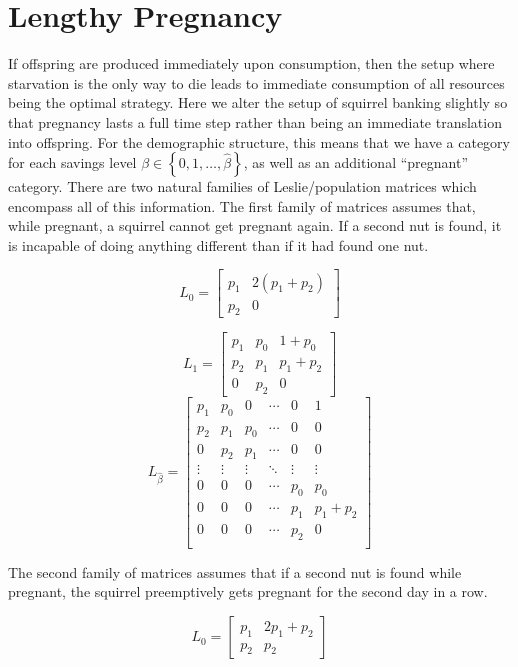 \section{Lengthy Pregnancy}
If offspring are produced immediately upon consumption, then the setup where starvation is the only way to die
leads to immediate consumption of all resources being the optimal strategy. Here we alter the setup of squirrel
banking slightly so that pregnancy lasts a full time step rather than being an immediate translation into offspring.
For the demographic structure, this means that we have a category for each savings level $\beta\in\left\{ 0
, 1, \ldots, \hat \beta\right\}$, as well as an additional ``pregnant'' category. There are two natural families
of Leslie/population matrices which encompass all of this information. The first family of matrices assumes that,
while pregnant, a squirrel cannot get pregnant again. If a second nut is found, it is incapable of doing anything
different than if it had found one nut.

$$L_0 = 
\begin{bmatrix}
    p_1 & 2(p_1 + p_2) \\
    p_2 & 0
\end{bmatrix}
$$

$$ L_1 =
\begin{bmatrix}
    p_1 & p_0 & 1 + p_0 \\
    p_2 & p_1 & p_1 + p_2 \\
    0 & p_2 & 0
\end{bmatrix}
$$
$$L_{\hat \beta} = 
\begin{bmatrix}
    p_1 & p_0 & 0 & \cdots & 0 & 1 \\
    p_2 & p_1 & p_0 & \cdots & 0 & 0 \\
    0 & p_2 & p_1 & \cdots & 0 & 0 \\
    \vdots & \vdots & \vdots & \ddots & \vdots & \vdots \\
    0 & 0 & 0 & \cdots & p_0 & p_0 \\
    0 & 0 & 0 & \cdots & p_1 & p_1 + p_2 \\
    0 & 0 & 0 & \cdots & p_2 & 0 \\
\end{bmatrix}
$$

The second family of matrices assumes that if a second nut is found while pregnant, the squirrel preemptively gets pregnant
for the second day in a row. 

$$L_0 = 
\begin{bmatrix}
    p_1 & 2p_1 + p_2 \\
    p_2 & p_2
\end{bmatrix}
$$

